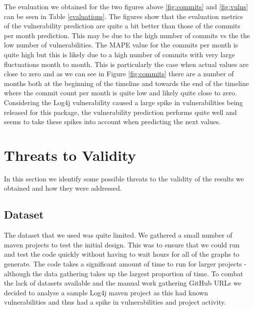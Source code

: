\documentclass[conference]{IEEEtran}
\begin{document}
The evaluation we obtained for the two figures above \ref{fig:commits} and \ref{fig:vulns} can be seen in Table \ref{evaluations}. The figures show that the evaluation metrics of the vulnerability prediction are quite a bit better than those of the commits per month prediction. This may be due to the high number of commits vs the the low number of vulnerabilities. The MAPE value for the commits per month is quite high but this is likely due to a high number of commits with very large fluctuations month to month. This is particularly the case when actual values are close to zero and as we can see in Figure \ref{fig:commits} there are a number of months both at the beginning of the timeline and towards the end of the timeline where the commit count per month is quite low and likely quite close to zero. Considering the Log4j vulnerability caused a large spike in vulnerabilities being released for this package, the vulnerability prediction performs quite well and seems to take these spikes into account when predicting the next values. 

\section{Threats to Validity}
In this section we identify some possible threats to the validity of the results we obtained and how they were addressed. 

\subsection{Dataset}
The dataset that we used was quite limited. We gathered a small number of maven projects to test the initial design. This was to ensure that we could run and test the code quickly without having to wait hours for all of the graphs to generate. The code takes a significant amount of time to run for larger projects - although the data gathering takes up the largest proportion of time. To combat the lack of datasets available and the manual work gathering GitHub URLs we decided to analyse a sample Log4j maven project as this had known vulnerabilities and thus had a spike in vulnerabilities and project activity. 
\end{document}
